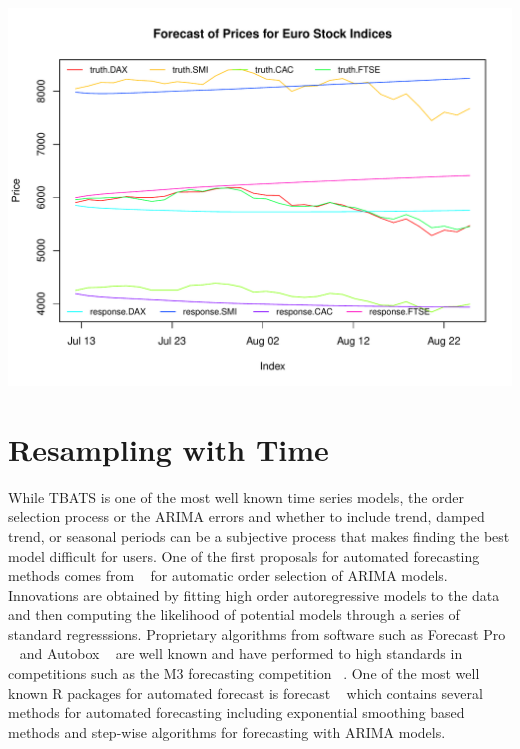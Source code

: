 \documentclass[12pt]{article}\usepackage[]{graphicx}\usepackage[]{color}
\makeatletter
\def\maxwidth{ %
  \ifdim\Gin@nat@width>\linewidth
    \linewidth
  \else
    \Gin@nat@width
  \fi
}
\newenvironment{knitrout}{}{} %
\theoremstyle{definition}
\let\proglang=\textsf
\newcommand{\pkg}[1]{{\fontseries{b}\selectfont #1}}
\makeatother
\begin{document}
\begin{knitrout}
\color{fgcolor}

{\centering \includegraphics[width=\maxwidth]{figure/bigVarplot-1} 

}



\end{knitrout}
\doublespacing

\section{Resampling with Time}

While TBATS is one of the most well known time series models, the order selection process or the ARIMA errors and whether to include trend, damped trend, or seasonal periods can be a subjective process that makes finding the best model difficult for users. One of the first proposals for automated forecasting methods comes from ~\cite{hannanOrder} for automatic order selection of ARIMA models. Innovations are obtained by fitting high order autoregressive models to the data and then computing the likelihood of potential models through a series of standard regresssions. Proprietary algorithms from software such as \proglang{Forecast Pro} ~\cite{forecastpro} and \proglang{Autobox} ~\cite{reillyautobox} are well known and have performed to high standards in competitions such as the M3 forecasting competition ~\cite{Makridakis2000451}. One of the most well known R packages for automated forecast is \pkg{forecast} ~\cite{HyndForecast} which contains several methods for automated forecasting including exponential smoothing based methods and step-wise algorithms for forecasting with ARIMA models.
\end{document}
